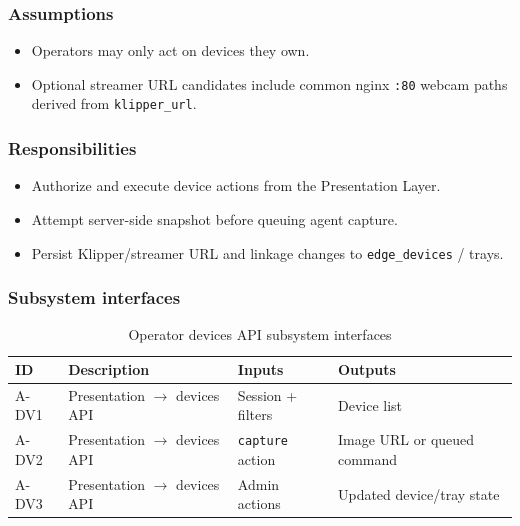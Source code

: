\subsubsection{Assumptions}
\begin{itemize}
  \item Operators may only act on devices they own.
  \item Optional streamer URL candidates include common nginx \texttt{:80} webcam paths derived from \texttt{klipper\_url}.
\end{itemize}

\subsubsection{Responsibilities}
\begin{itemize}
  \item Authorize and execute device actions from the Presentation Layer.
  \item Attempt server-side snapshot before queuing agent capture.
  \item Persist Klipper/streamer URL and linkage changes to \texttt{edge\_devices} / trays.
\end{itemize}

\subsubsection{Subsystem interfaces}
\begin{table}[H]
\centering
\small
\begin{tabular}{|p{0.9cm}|p{3.4cm}|p{3.0cm}|p{3.5cm}|}
\hline
\textbf{ID} & \textbf{Description} & \textbf{Inputs} & \textbf{Outputs} \\
\hline
A-DV1 & Presentation $\rightarrow$ devices API & Session + filters & Device list \\
\hline
A-DV2 & Presentation $\rightarrow$ devices API & \texttt{capture} action & Image URL or queued command \\
\hline
A-DV3 & Presentation $\rightarrow$ devices API & Admin actions & Updated device/tray state \\
\hline
\end{tabular}
\caption{Operator devices API subsystem interfaces}
\end{table}
